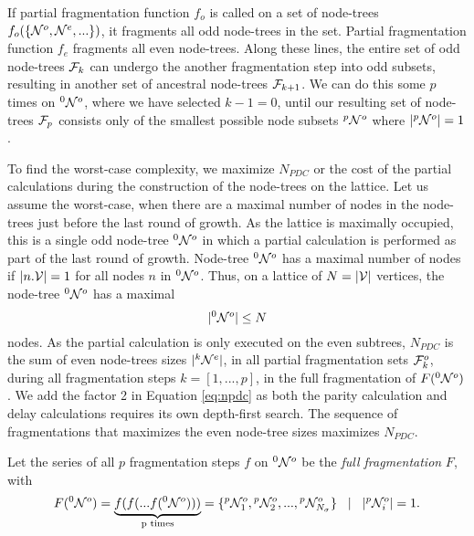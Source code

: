% 

If partial fragmentation function $f_o$ is called on a set of node-trees $f_o(\{\mathcal{N}^o, \mathcal{N}^e, ...\})$, it fragments all odd node-trees in the set. Partial fragmentation function $f_e$ fragments all even node-trees. Along these lines, the entire set of odd node-trees $\mathcal{F}_k$ can undergo the another fragmentation step into odd subsets, resulting in another set of ancestral node-trees $\mathcal{F}_{k+1}$. We can do this some $p$ times on ${}^{0}\mathcal{N}^o$, where we have selected $k-1=0$, until our resulting set of node-trees $\mathcal{F}_{p}$ consists only of the smallest possible node subsets ${}^{p}\mathcal{N}^o$ where $|{}^{p}\mathcal{N}^o|=1$.


To find the worst-case complexity, we maximize $N_{PDC}$ or the cost of the partial calculations during the construction of the node-trees on the lattice. Let us assume the worst-case, when there are a maximal number of nodes in the node-trees just before the last round of growth. As the lattice is maximally occupied, this is a single odd node-tree ${}^{0}\mathcal{N}^o$ in which a partial calculation is performed as part of the last round of growth. Node-tree ${}^{0}\mathcal{N}^o$ has a maximal number of nodes if $|n.\mathcal{V}|=1$ for all nodes $n$ in ${}^{0}\mathcal{N}^o$. Thus, on a lattice of $N=|\mathcal{V}|$ vertices, the node-tree ${}^{0}\mathcal{N}^o$ has a maximal
\begin{equation}\label{eq:limitnsetsize}
  \abs{\pre{0}\nset^o} \leq N
\end{equation}
nodes. As the partial calculation is only executed on the even subtrees, $N_{PDC}$ is the sum of even node-trees sizes $|{}^{k}\mathcal{N}^e|$, in all partial fragmentation sets $\mathcal{F}^o_{k}$, during all fragmentation steps $k=[1,...,p]$, in the full fragmentation of $F({}^{0}\mathcal{N}^o)$. We add the factor 2 in Equation \eqref{eq:npdc} as both the parity calculation and delay calculations requires its own depth-first search. The sequence of fragmentations that maximizes the even node-tree sizes maximizes $N_{PDC}$.
\begin{definition}\label{def:fullfrag}
  Let the series of all $p$ fragmentation steps $f$ on ${}^{0}\mathcal{N}^o$ be the \emph{full fragmentation} $F$, with
  \begin{equation}\label{eq:fullfrag}
    F(\pre{0}\nset^o) = \underbrace{f(f(...f(\pre{0}\nset^o)))}_\text{p times} = \{\pre{p}\nset^{o}_1, \pre{p}\nset^{o}_2,...,\pre{p}\nset^{o}_{N_\sigma} \} \hspace{.3cm} | \hspace{.3cm} \abs{\pre{p}\nset^{o}_i} = 1.
  \end{equation}
\end{definition}

